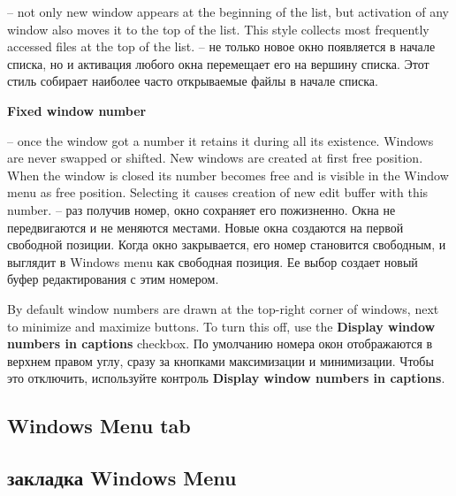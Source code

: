 \begin{description}
\ifenglish
-- not only new window appears at the beginning of the list, but activation of any
window also moves it to the top of the list. This style collects most frequently
accessed files at the top of the list.
 \else
-- не только новое окно появляется в начале списка, но и активация любого окна
перемещает его на вершину списка. Этот стиль собирает наиболее часто открываемые
файлы в начале списка.
\fi

\item {\bf Fixed window number}

\ifenglish
-- once the window got a number it retains it during all its existence. Windows are
never swapped or shifted. New windows are created at first free position.
When the window is closed its number becomes free and is visible in the Window
menu as free position. Selecting it causes creation of new edit buffer with this
number.
 \else
-- раз получив номер, окно сохраняет его пожизненно. Окна не передвигаются и не 
меняются местами. Новые окна создаются на первой свободной позиции. Когда окно 
закрывается, его номер становится свободным, и выглядит в Windows menu как
свободная позиция. Ее выбор создает новый буфер редактирования с этим номером.
\fi 

\end{description}

\ifenglish
By default window numbers are drawn at the top-right corner of windows,
next to minimize and maximize buttons. To turn this off, use the
{\bf Display window numbers in captions} checkbox.
 \else
По умолчанию номера окон отображаются в верхнем правом углу, сразу за 
кнопками максимизации и минимизации. Чтобы это отключить, используйте 
контроль {\bf Display window numbers in captions}.
\fi


\ifenglish
\subsection {Windows Menu tab}
 \else
\subsection {закладка Windows Menu}
\fi
{}

